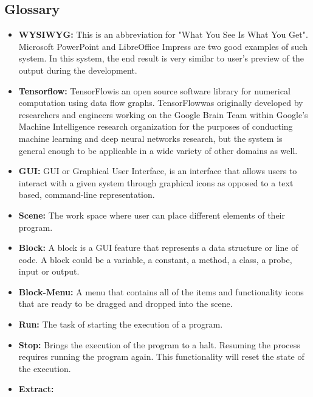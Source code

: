\documentclass[journal,10pt,onecolumn,compsoc]{IEEEtran} \usepackage[margin=1.0in]{geometry} \usepackage{pdfpages} \usepackage{graphicx}
\begin{document}
\subsection{Glossary}
\begin{itemize}
	\item \textbf{WYSIWYG:}
		This is an abbreviation for "What You See Is What You Get".
		Microsoft PowerPoint and LibreOffice Impress are two good examples of such system. 
		In this system, the end result is very similar to user's preview of the output during the development.\\
	\item \textbf{Tensorflow\texttrademark:}
		TensorFlow\texttrademark is an open source software library for numerical computation using data flow graphs.
		TensorFlow\texttrademark was originally developed by researchers and engineers working on the Google Brain Team within Google's Machine Intelligence research organization for the purposes of 
		conducting machine learning and deep neural networks research, but the system is general enough to be applicable in a wide variety of other domains as well.\\
	\item \textbf{GUI:}
		GUI or Graphical User Interface, is an interface that allows users to interact with a given system through graphical icons as opposed to a text based, command-line representation.\\
	\item \textbf{Scene:}
		The work space where user can place different elements of their program.\\
	\item \textbf{Block:}
		A block is a GUI feature that represents a data structure or line of code. A block could be a variable, a constant, a method, a class, a probe, input or output.\\
	\item \textbf{Block-Menu:}
		A menu that contains all of the items and functionality icons that are ready to be dragged and dropped into the scene.\\
	\item \textbf{Run:}
		The task of starting the execution of a program.\\
	\item \textbf{Stop:}
		Brings the execution of the program to a halt. Resuming the process requires running the program again.
		This functionality will reset the state of the execution.\\
	\item \textbf{Extract:}

\end{itemize}
\end{document}
